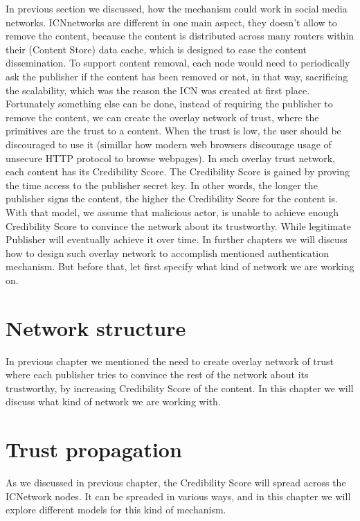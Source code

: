 \documentclass[nostrict]{szablonPG}
\begin{document}
In previous section we discussed, how the mechanism could work in social media networks. ICNnetworks are different in one main aspect, they doesn't allow to remove the content, because the content is distributed across many routers within their (Content Store) data cache, which is designed to ease the content dissemination. To support content removal, each node would need to periodically ask the publisher if the content has been removed or not, in that way, sacrificing the scalability, which was the reason the ICN was created at first place. 
Fortunately something else can be done, instead of requiring the publisher to remove the content, we can create the overlay network of trust, where the primitives are the trust to a content. When the trust is low, the user should be discouraged to use it (simillar how modern web browsers discourage usage of unsecure HTTP protocol to browse webpages). In such overlay trust network, each content has its Credibility Score. The Credibility Score is gained by proving the time access to the publisher secret key. In other words, the longer the publisher signs the content, the higher the Credibility Score for the content is. With that model, we assume that malicious actor, is unable to achieve enough Credibility Score to convince the network about its trustworthy. While legitimate Publisher will eventually achieve it over time. In further chapters we will discuss how to design such overlay network to accomplish mentioned authentication mechanism. But before that, let first specify what kind of network we are working on.

\section{Network structure}
In previous chapter we mentioned the need to create overlay network of trust where each publisher tries to convince the rest of the network about its trustworthy, by increasing Credibility Score of the content. In this chapter we will discuss what kind of network we are working with. 

\section{Trust propagation}

As we discussed in previous chapter, the Credibility Score will spread across the ICNetwork nodes. It can be spreaded in various ways, and in this chapter we will explore different models for this kind of mechanism. 
\end{document}
